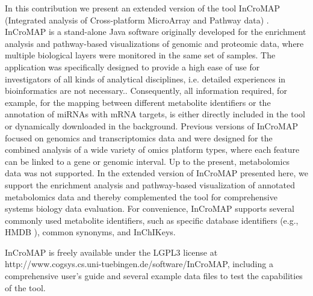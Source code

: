\documentclass[final,5p,times,twocolumn]{elsarticle}
\newcommand\red[1]{{\color{red}#1}}
\begin{document}
In this contribution we present an extended version of the tool InCroMAP \red{(Integrated analysis of Cross-platform MicroArray and Pathway data)} \cite{Wrzodek2012a,Wrzodek2012b}. InCroMAP is a stand-alone Java software originally developed for the enrichment analysis and pathway-based visualizations of genomic and proteomic data, where multiple biological layers were monitored in the same set of samples. \red{The application was specifically designed to provide a high ease of use for investigators of all kinds of analytical disciplines, i.e. detailed experiences in bioinformatics are not necessary.}. Consequently, all information required, for example, for the mapping between different metabolite identifiers or the annotation of miRNAs with mRNA targets, is either directly included in the tool or dynamically downloaded in the background. Previous versions of InCroMAP focused on genomics and transcriptomics data and were designed for the combined analysis of a wide variety of omics platform types, where 
each feature can be linked to a gene or genomic interval. Up to the present, metabolomics data was not supported. In the extended version of InCroMAP presented here, we support the enrichment analysis and pathway-based visualization of annotated metabolomics data and thereby complemented the tool for comprehensive systems biology data evaluation. For convenience, InCroMAP supports several commonly used metabolite identifiers, such as specific database identifiers (e.g., HMDB \cite{Wishart2009}), common synonyms, and InChIKeys. 

InCroMAP is freely available under the LGPL3 license at http://www.cogsys.cs.uni-tuebingen.de/software/InCroMAP, including a comprehensive user’s guide and several example data files to test the capabilities of the tool.
\end{document}
